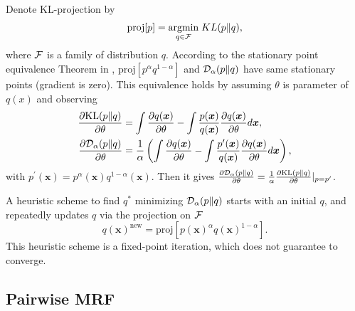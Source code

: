 Denote KL-projection by
\begin{equation}
  \text{proj}[p] = \underset{q \in \mathcal{F}}{\operatorname{argmin}}\; KL(p\|q),
\end{equation}
where $\mathcal{F}$ is a family of distribution $q$.
According to the stationary point equivalence Theorem in \cite{divergence-measures-and-message-passing}, $\text{proj}[p^{\alpha}q^{1- \alpha}]$ and $\mathcal{D}_{\alpha}(p\|q)$ have same stationary points (gradient is zero). This equivalence holds by assuming $\theta$ is parameter of $q(x)$ and observing
\begin{align}
  \frac{ \partial \mathrm{KL}(p\|q)}{\partial \theta} &= \int \frac{ \partial q(\bm{x})}{\partial \theta} - \int \frac{p(\bm{x})}{q(\bm{x})} \frac{ \partial q(\bm{x})}{\partial \theta} d\bm{x}, \nonumber \\
  \frac{ \partial \mathrm{\mathcal{D}_{\alpha}}(p\|q)}{\partial \theta} &= \frac{1}{\alpha} \left( \int \frac{ \partial q(\bm{x})}{\partial \theta} - \int \frac{p^{\prime}(\bm{x})}{q(\bm{x})} \frac{ \partial q(\bm{x})}{\partial \theta} d\bm{x}  \right), \nonumber
\end{align}
with $p^{\prime}(\bm{x}) = p^{\alpha}(\bm{x})q^{1-\alpha}(\bm{x})$. Then it gives $\frac{ \partial \mathrm{\mathcal{D}_{\alpha}}(p\|q)}{\partial \theta}  = \frac{1}{\alpha}\frac{ \partial \mathrm{KL}(p\|q)}{\partial \theta}|_{p=p^{\prime}}$.

A heuristic scheme to find $q^{\ast}$ minimizing $\mathcal{D}_{\alpha}(p\|q)$ starts with an initial $q$, and repeatedly updates $q$ via the projection on $\mathcal{F}$
\begin{equation}\label{eq:fixed-point-iter}
  q(\bm{x})^{\text{new}}  = \text{proj}[p(\bm{x})^{\alpha}q(\bm{x})^{1-\alpha}].
\end{equation}
This heuristic scheme is a fixed-point iteration, which does not guarantee to converge.

\subsection{Pairwise MRF}

